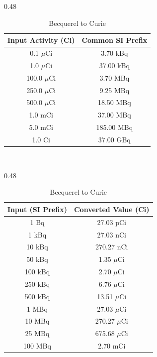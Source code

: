 \documentclass{article}
\begin{document}
\begin{table}[H]
\centering
\caption{Radiation Activity Conversion Reference Tables}
\label{tab:activity_conversions}

\begin{subtable}[t]{0.48\textwidth}
\centering
\caption{Curie to Becquerel}
\label{tab:ci_bq_conversion}
\begin{tabular}{|c|c|} \hline
\textbf{Input Activity (Ci)} & \textbf{Common SI Prefix} \\ \hline
0.1 $\mu$Ci   & 3.70 kBq \\ \hline
1.0 $\mu$Ci   & 37.00 kBq \\ \hline
100.0 $\mu$Ci & 3.70 MBq \\ \hline
250.0 $\mu$Ci & 9.25 MBq \\ \hline
500.0 $\mu$Ci & 18.50 MBq \\ \hline
1.0 mCi       & 37.00 MBq \\ \hline
5.0 mCi       & 185.00 MBq \\ \hline
1.0 Ci        & 37.00 GBq \\ \hline
\end{tabular}
\\ \vspace{2.2cm} %
\end{subtable}
\hfill %
\begin{subtable}[t]{0.48\textwidth}
\centering
\caption{Becquerel to Curie}
\label{tab:bq_ci_conversion}
\begin{tabular}{|c|c|} \hline
\textbf{Input (SI Prefix)} & \textbf{Converted Value (Ci)} \\ \hline
1 Bq        & 27.03 pCi \\ \hline
1 kBq       & 27.03 nCi \\ \hline
10 kBq      & 270.27 nCi \\ \hline
50 kBq      & 1.35 $\mu$Ci \\ \hline
100 kBq     & 2.70 $\mu$Ci \\ \hline
250 kBq     & 6.76 $\mu$Ci \\ \hline
500 kBq     & 13.51 $\mu$Ci \\ \hline
1 MBq       & 27.03 $\mu$Ci \\ \hline
10 MBq      & 270.27 $\mu$Ci \\ \hline
25 MBq      & 675.68 $\mu$Ci \\ \hline
100 MBq     & 2.70 mCi \\ \hline
\end{tabular}
\end{subtable}

\end{table}
\end{document}
